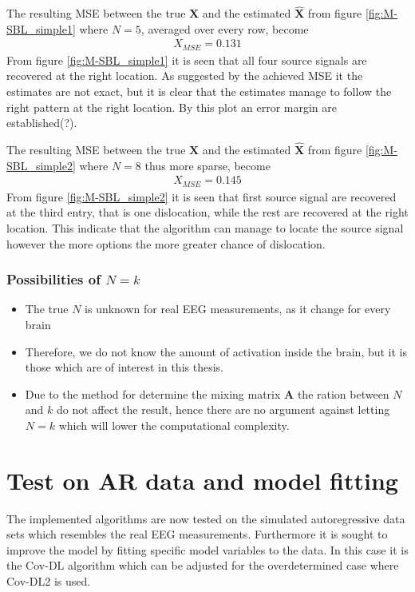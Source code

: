 The resulting MSE between the true $\textbf{X}$ and the estimated $\hat{\textbf{X}}$ from figure \ref{fig:M-SBL_simple1} where $N = 5$, averaged over every row, become 
\begin{align*}
X_{MSE} = 0.131 
\end{align*}
From figure \ref{fig:M-SBL_simple1} it is seen that all four source signals are recovered at the right location. As suggested by the achieved MSE it the estimates are not exact, but it is clear that the estimates manage to follow the right pattern at the right location. By this plot an error margin are established(?).  

The resulting MSE between the true $\textbf{X}$ and the estimated $\hat{\textbf{X}}$ from figure \ref{fig:M-SBL_simple2} where $N = 8$ thus more sparse, become 
\begin{align*}
X_{MSE} = 0.145 
\end{align*}
From figure \ref{fig:M-SBL_simple2} it is seen that first source signal are recovered at the third entry, that is one dislocation, while the rest are recovered at the right location. This indicate that the algorithm can manage to locate the source signal however the more options the more greater chance of dislocation.     

\subsubsection*{Possibilities of $N=k$}
\begin{itemize}
	\item The true $N$ is unknown for real EEG measurements, as it change for every brain
	\item Therefore, we do not know the amount of activation inside the brain, but it is those which are of interest in this thesis.
	\item Due to the method for determine the mixing matrix $\textbf{A}$ the ration between $N$ and $k$ do not affect the result, hence there are no argument against letting $N=k$ which will lower the computational complexity.    
\end{itemize}

\section{Test on AR data and model fitting}
The implemented algorithms are now tested on the simulated autoregressive data sets which resembles the real EEG measurements. Furthermore it is sought to improve the model by fitting specific model variables to the data. In this case it is the Cov-DL algorithm which can be adjusted for the overdetermined case where Cov-DL2 is used.      

